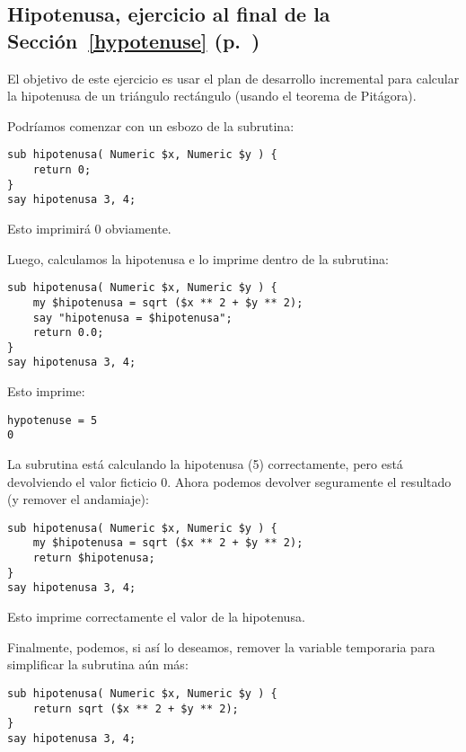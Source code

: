 \subsection{Hipotenusa, ejercicio al final de la Sección~\ref{hypotenuse} (p.~\pageref{hypotenuse})}
\label{sol_hypotenuse}

El objetivo de este ejercicio es usar el plan de desarrollo incremental
para calcular la hipotenusa de un triángulo rectángulo (usando el teorema
de Pitágora).

Podríamos comenzar con un esbozo de la subrutina:

\begin{verbatim}
sub hipotenusa( Numeric $x, Numeric $y ) {
    return 0;
}
say hipotenusa 3, 4;
\end{verbatim}
%

Esto imprimirá 0 obviamente.

Luego, calculamos la hipotenusa e lo imprime dentro de la subrutina:

\begin{verbatim}
sub hipotenusa( Numeric $x, Numeric $y ) {
    my $hipotenusa = sqrt ($x ** 2 + $y ** 2);
    say "hipotenusa = $hipotenusa";
    return 0.0;
}
say hipotenusa 3, 4;
\end{verbatim}
%

Esto imprime:

\begin{verbatim}
hypotenuse = 5
0
\end{verbatim}
%

La subrutina está calculando la hipotenusa (5) correctamente,
pero está devolviendo el valor ficticio 0. Ahora podemos devolver
seguramente el resultado (y remover el andamiaje):

\begin{verbatim}
sub hipotenusa( Numeric $x, Numeric $y ) {
    my $hipotenusa = sqrt ($x ** 2 + $y ** 2);
    return $hipotenusa;
}
say hipotenusa 3, 4;
\end{verbatim}
%

Esto imprime correctamente el valor de la hipotenusa.

Finalmente, podemos, si así lo deseamos, remover la variable 
temporaria para simplificar la subrutina aún más:
\begin{verbatim}
sub hipotenusa( Numeric $x, Numeric $y ) {
    return sqrt ($x ** 2 + $y ** 2);
}
say hipotenusa 3, 4;
\end{verbatim}
%

